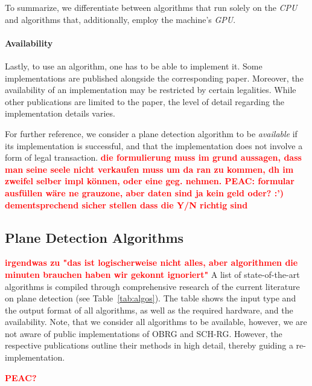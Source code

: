 \documentclass[main.tex]{subfiles}
\begin{document}
To summarize, we differentiate between algorithms that run solely on the \textit{CPU} and algorithms that, additionally, employ the
machine's \textit{GPU}.

\paragraph{Availability}
Lastly, to use an algorithm, one has to be able to implement it. Some implementations are published alongside the corresponding paper.
Moreover, the availability of an implementation may be restricted by certain legalities.
While other publications are limited to the paper, the level of detail regarding the implementation details varies.

For further reference, we consider a plane detection algorithm to be \textit{available} if its implementation is successful, and
that the implementation does not involve a form of legal transaction.
\textbf{\textcolor{red}{die formulierung muss im grund aussagen, dass man seine seele nicht verkaufen muss um da ran zu kommen, dh
        im zweifel selber impl können, oder eine geg. nehmen. PEAC: formular ausfüllen wäre ne grauzone, aber daten sind ja kein geld oder? :')}}
\textbf{\textcolor{red}{dementsprechend sicher stellen dass die Y/N richtig sind}}

\subsection{Plane Detection Algorithms}
\label{subsec:pdaselect}
\textbf{\textcolor{red}{irgendwas zu "das ist logischerweise nicht alles, aber algorithmen die minuten brauchen haben wir gekonnt ignoriert"}}
A list of state-of-the-art algorithms is compiled through comprehensive research of the current literature on plane detection (see Table~\ref{tab:algos}).
The table shows the input type and the output format of all algorithms, as well as the required hardware, and the availability.
Note, that we consider all algorithms to be available, however, we are not aware of public implementations of OBRG and SCH-RG.
However, the respective publications outline their methods in high detail, thereby guiding a re-implementation.

\textbf{\textcolor{red}{PEAC?}}
\end{document}

